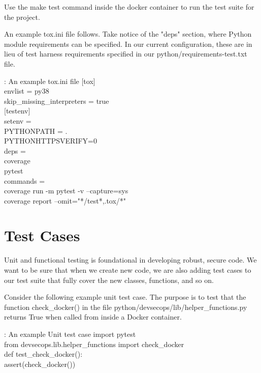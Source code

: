 \justify
Use the make test command inside the docker container to run the test suite for the project.

\justify
An example tox.ini file follows. Take notice of the "deps" section, where
Python module requirements can be specified. In our current configuration, these are in lieu of test harness requirements specified in our python/requirements-test.txt file.

\begin{mybox}{\thetcbcounter: An example tox.ini file}
  [tox]\\
  envlist = py38\\
  skip\_missing\_interpreters = true\\

  [testenv]\\
  setenv =\\
  PYTHONPATH = .\\
  PYTHONHTTPSVERIFY=0\\
  deps =\\
  coverage\\
  pytest\\
  commands =\\
  coverage run -m pytest -v --capture=sys\\
  coverage report --omit="*/test*,.tox/*"
\end{mybox}

\section{Test Cases}

\justify
Unit and functional testing is foundational in developing robust, secure
code. We want to be sure that when we create new code, we are also adding test cases to our test suite that fully cover the new classes, functions, and so on.


\justify
Consider the following example unit test case. The purpose is to test
that the function check\_docker() in the file python/devsecops/lib/helper\_functions.py returns True when called from inside a Docker container.

\begin{mybox}{\thetcbcounter: An example Unit test case}
  import pytest\\
  from devsecops.lib.helper\_functions import check\_docker\\

  def test\_check\_docker():\\
  assert(check\_docker())
\end{mybox}

